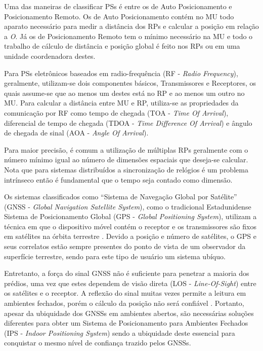 Uma das maneiras de classificar PSs é entre os de Auto Posicionamento e
Posicionamento Remoto. Os de Auto Posicionamento contém no MU todo aparato
necessário para medir a distância dos RPs e calcular a posição em relação a
\emph{O}. Já os de Posicionamento Remoto tem o mínimo necessário na MU e todo
o trabalho de cálculo de distância e posição global é feito nos RPs ou em uma
unidade coordenadora destes.

Para PSs eletrônicos baseados em radio-frequência (RF - \emph{Radio
Frequency}), geralmente, utilizam-se dois componentes básicos, Transmissores e
Receptores, os quais assume-se que ao menos um destes está no RP e ao menos um
outro no MU. Para calcular a distância entre MU e RP, utiliza-se as propriedades
da comunicação por RF como tempo de chegada (TOA - \emph{Time Of Arrival}),
diferencial de tempo de chegada (TDOA - \emph{Time Difference Of Arrival}) e
ângulo de chegada de sinal (AOA - \emph{Angle Of Arrival}).

Para maior precisão, é comum a utilização de múltiplas RPs geralmente com o
número mínimo igual ao número de dimensões espaciais que deseja-se calcular.
Nota que para sistemas distribuídos a sincronização de relógios é um problema
intrínseco então é fundamental que o tempo seja contado como dimensão.

Os sistemas classificados como ``Sistema de Navegação Global por Satélite''
(GNSS - \emph{Global Navigation Satellite System}), como o tradicional
Estadunidense Sistema de Posicionamento Global (GPS - \emph{Global Positioning
System}), utilizam a técnica em que o dispositivo móvel contém o receptor e os
transmissores são fixos em satélites na órbita terrestre \cite{Djuknic2001}.
Devido a posição e número de satélites, o GPS e seus correlatos estão sempre
presentes do ponto de vista de um observador da superfície terrestre, sendo para
este tipo de usuário um sistema ubíquo.

Entretanto, a força do sinal GNSS não é suficiente para penetrar a maioria dos
prédios, uma vez que estes dependem de visão direta (LOS -
\emph{Line-Of-Sight}) entre os satélites e o receptor. A reflexão do sinal
muitas vezes permite a leitura em ambientes fechados, porém o cálculo da posição
não será confiável \cite{Chen2000}. Portanto, apesar da ubiquidade dos
GNSSs em ambientes abertos, são necessárias soluções diferentes para obter um
Sistema de Posicionamento para Ambientes Fechados (IPS - \emph{Indoor
Positioning System}) sendo a ubiquidade deste essencial para conquistar o mesmo
nível de confiança trazido pelos GNSSs.

